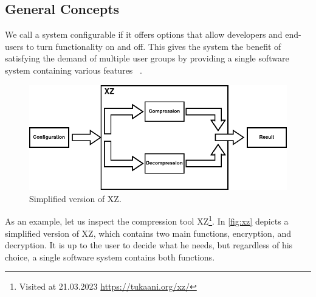 \subsection{General Concepts}\label{ch:general-concepts}
We call a system configurable if it offers options that allow developers and end-users to turn functionality on and off.
This gives the system the benefit of satisfying the demand of multiple user groups by providing a single software system containing various features
~\cite{TooManyKnobs}.


\begin{figure}[h]
    \centering
    \includegraphics[scale=0.55]{gfx/ConfigurableSystemXZ.png}
    \caption{Simplified version of \textsc{XZ}.}
    \label{fig:xz}
\end{figure}

As an example, let us inspect the compression tool \textsc{XZ}\footnote{Visited at 21.03.2023 \url{https://tukaani.org/xz/}}.
In \autoref{fig:xz} depicts a simplified version of \textsc{XZ}, which contains two main functions, encryption, and decryption. 
It is up to the user to decide what he needs, but regardless of his choice, a single software system contains both functions.
